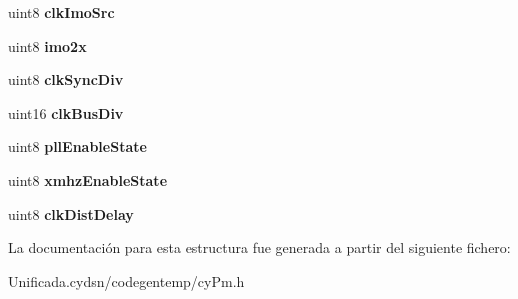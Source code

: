 \begin{DoxyCompactItemize}
\mbox{\label{structcy_pm_clock_backup_struct_a78b7fff6a441bd05d0f54f129bc976c2}} 
uint8 {\bfseries clk\+Imo\+Src}
\item 
\mbox{\label{structcy_pm_clock_backup_struct_a384d4af256bea8ec690204d8a27c1995}} 
uint8 {\bfseries imo2x}
\item 
\mbox{\label{structcy_pm_clock_backup_struct_a235ef6b0ae52ce9b8153274a6195a926}} 
uint8 {\bfseries clk\+Sync\+Div}
\item 
\mbox{\label{structcy_pm_clock_backup_struct_a2bebbe8057174c7b065135ff0f92110e}} 
uint16 {\bfseries clk\+Bus\+Div}
\item 
\mbox{\label{structcy_pm_clock_backup_struct_a5b844f04b01700789e29785471241143}} 
uint8 {\bfseries pll\+Enable\+State}
\item 
\mbox{\label{structcy_pm_clock_backup_struct_abff42799246065e4e98c46398b6d8ff9}} 
uint8 {\bfseries xmhz\+Enable\+State}
\item 
\mbox{\label{structcy_pm_clock_backup_struct_a168a0685ef3f2609ff4b8820beae55ce}} 
uint8 {\bfseries clk\+Dist\+Delay}
\end{DoxyCompactItemize}


La documentación para esta estructura fue generada a partir del siguiente fichero\+:\begin{DoxyCompactItemize}
\item 
Unificada.\+cydsn/codegentemp/cy\+Pm.\+h\end{DoxyCompactItemize}
